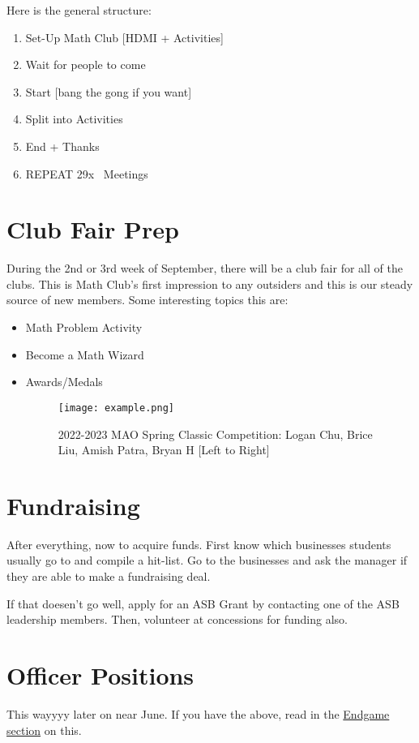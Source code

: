 \noindent
Here is the general structure:
    \begin{enumerate}
        \item Set-Up Math Club [HDMI + Activities]
        \item Wait for people to come 
        \item Start [bang the gong if you want]
        \item Split into Activities
        \item End + Thanks
        \item REPEAT 29x~ Meetings
    \end{enumerate}

\section{Club Fair Prep}
During the 2nd or 3rd week of September, there will be a club fair for all of the clubs.
This is Math Club's first impression to any outsiders and this is our steady source of new members.
\newline
\newline
Some interesting topics this are:

\begin{itemize}
    \item Math Problem Activity
    \item Become a Math Wizard 
    \item Awards/Medals
    \begin{figure}[H]
        \centering
        \texttt{[image: example.png]}
        \caption{2022-2023 MAO Spring Classic Competition: Logan Chu, Brice Liu, Amish Patra, Bryan H [Left to Right]}
        \label{fig:old competition image example}
    \end{figure}
\end{itemize}

\section{Fundraising}
After everything, now to acquire funds.
First know which businesses students usually go to and compile a hit-list.
Go to the businesses and ask the manager if they are able to make a fundraising deal.

If that doesen't go well, apply for an ASB Grant by contacting one of the ASB leadership members.
Then, volunteer at concessions for funding also.

\section{Officer Positions}
This wayyyy later on near June. If you have  the above,
read in the \hyperref[sec:Officer]{ Endgame section} on this. 
